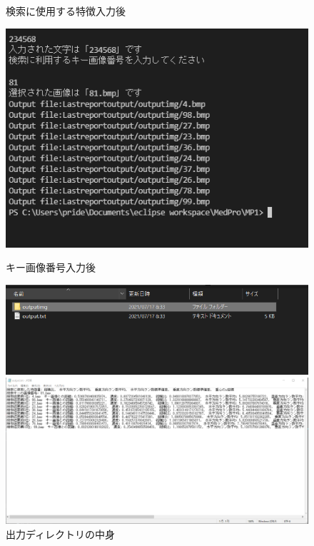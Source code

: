 \begin{enumerate}
\begin{figure}[htbp]
\begin{minipage}[t]{0.33\hsize}
      \centering
      \caption{検索に使用する特徴入力後}
      \label{graph:30}
    \end{minipage}
    \begin{minipage}[t]{0.33\hsize}
      \includegraphics[scale=0.4]{入力3.PNG}
      \centering
      \caption{キー画像番号入力後}
      \label{graph:31}
    \end{minipage}
    \begin{minipage}[t]{0.33\hsize}
      \includegraphics[scale=0.35]{入力4.PNG}
      \centering
      \caption{出力ディレクトリの中身}
      \label{graph:32}
    \end{minipage}
    \begin{minipage}[t]{0.66\hsize}
      \includegraphics[scale=0.25]{入力5.PNG}

\end{minipage}
\end{figure}
\end{enumerate}
